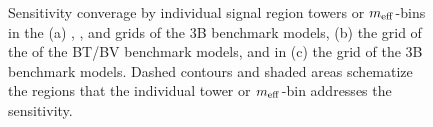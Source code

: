 \begin{figure}[h]
  \centering
    \caption{ 
     Sensitivity converage by individual signal region towers or $m_{\mathrm{eff}}$-bins in the 
    (a) \dire, \xhalf, \DMtw and \DMth grids of the 3B benchmark models, (b) the \varx grid of the of the BT/BV benchmark models, and in (c) the \varx grid of the 3B benchmark models. Dashed contours and shaded areas schematize the regions that the individual tower or $m_{\mathrm{eff}}$-bin addresses the sensitivity.}
    \label{fig::SRdefinition::towerCoverage2}
\end{figure}


